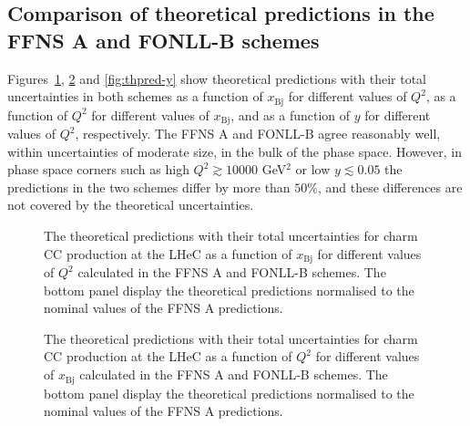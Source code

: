 \documentclass[pdftex,twocolumn,epjc3]{svjour3}          %
\newcommand{\xbj}{\ensuremath{x_{\text{Bj}}}\xspace}
\newcommand{\fonll} {{FONLL-B}\xspace}
\newcommand{\ffns} {{FFNS A}\xspace}
\begin{document}
\subsection{Comparison of theoretical predictions in the \ffns and \fonll schemes}
\label{sec:thpred-comparison}

Figures~\ref{fig:thpred-x}, \ref{fig:thpred-q2} and \ref{fig:thpred-y} show theoretical predictions with their total uncertainties in both schemes as a function of \xbj for different values of $Q^2$, as a function of $Q^2$ for different values of \xbj, and as a function of $y$ for different values of $Q^2$, respectively. The \ffns and \fonll agree reasonably well, within uncertainties of moderate size, in the bulk of the phase space. However, in phase space corners such as high $Q^2 \gtrsim 10000$ GeV$^2$ or low $y \lesssim 0.05$ the predictions in the two schemes differ by more than $50\%$, and these differences are not covered by the theoretical uncertainties.

\begin{figure}
    \centering
    \caption{The theoretical predictions with their total uncertainties for charm CC production at the LHeC as a function of \xbj for different values of $Q^2$ calculated in the \ffns and \fonll schemes. The bottom panel display the theoretical predictions normalised to the nominal values of the \ffns predictions.}
    \label{fig:thpred-x}
\end{figure}

\begin{figure}
    \centering
    \caption{The theoretical predictions with their total uncertainties for charm CC production at the LHeC as a function of $Q^2$ for different values of \xbj calculated in the \ffns and \fonll schemes. The bottom panel display the theoretical predictions normalised to the nominal values of the \ffns predictions.}
    \label{fig:thpred-q2}
\end{figure}
\end{document}
